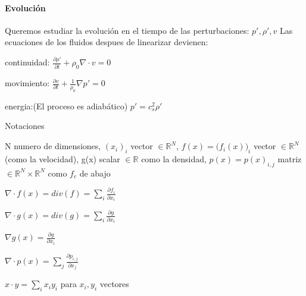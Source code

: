 \documentclass{article}
\begin{document}
\paragraph{Evolución}
Queremos estudiar la evolución en el tiempo de las perturbaciones: $p\prime, \rho\prime, v$
Las ecuaciones de los fluidos despues de linearizar devienen:
\begin{description}  
\item continuidad: $ \frac{\partial \rho\prime}{\partial t} + \rho_0 \nabla \cdot v = 0 $
\item movimiento: $ \frac{\partial v}{\partial t} + \frac{1}{\rho_0} \nabla p\prime = 0 $
\item energia:(El proceso es adiabático) $p\prime = c_s^{2} \rho\prime$

\end{description} 
Notaciones
\begin{description}  
\item N numero de dimensiones, $(x_i)_i$ vector $\in \mathbb{R}^N $, $f(x)=\big(f_i(x)\big)_i$ vector $\in \mathbb{R}^N $(como la velocidad), g(x) scalar $\in \mathbb{R}$
como la densidad, $p(x) = p(x)_{i,j}$ matriz $\in \mathbb{R}^N \times \mathbb{R}^N $ como $f_c$ de abajo
\item $\nabla \cdot f(x) = div(f) = \sum_i\frac{\partial f_i}{\partial x_i}$
\item $\nabla \cdot g(x) = div(g) = \sum_i\frac{\partial g}{\partial x_i}$
\item $\nabla g(x) = \frac{\partial g}{\partial x_i}$
\item $\nabla \cdot p(x) = \sum_j\frac{\partial p_{i,j}}{\partial x_j}$
\item $x \cdot y = \sum_{i} x_i y_i$ para $x_i , y_i$ vectores
\end{description} 
 
\end{document}
